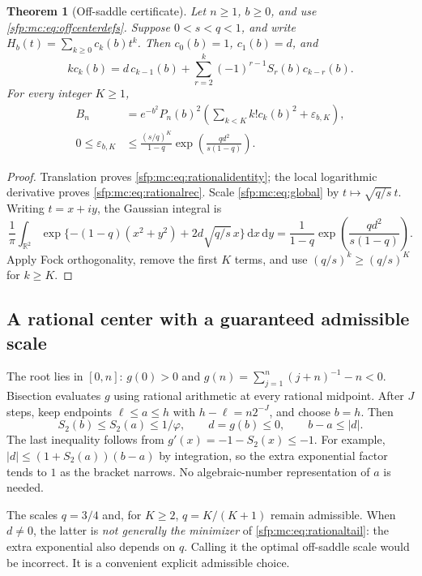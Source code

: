 \documentclass[11pt,letterpaper]{article}
\numberwithin{equation}{section}
\newtheorem{theorem}{Theorem}[section]
\theoremstyle{definition}\newtheorem{definition}[theorem]{Definition}
\theoremstyle{remark}\newtheorem{remark}[theorem]{Remark}
\newcommand{\dd}{\,\mathrm d}
\begin{document}
\begin{theorem}[Off-saddle certificate]\label{sfp:mc:thm:rational}
Let $n\geq1$, $b\geq0$, and use \eqref{sfp:mc:eq:offcenterdefs}.
Suppose $0<s<q<1$, and write $H_b(t)=\sum_{k\geq0}c_k(b)t^k$.
Then $c_0(b)=1$, $c_1(b)=d$, and
\begin{equation}\label{sfp:mc:eq:rationalrec}
 kc_k(b)=d\,c_{k-1}(b)+
 \sum_{r=2}^{k}(-1)^{r-1}S_r(b)c_{k-r}(b).
\end{equation}
For every integer $K\geq1$,
\begin{align}
 B_n&=e^{-b^2}P_n(b)^2
    \left(\sum_{k<K}k!c_k(b)^2+\varepsilon_{b,K}\right),
    \label{sfp:mc:eq:rationalidentity}\\
 0\leq\varepsilon_{b,K}
 &\leq\frac{(s/q)^K}{1-q}
     \exp\left(\frac{qd^2}{s(1-q)}\right).
    \label{sfp:mc:eq:rationaltail}
\end{align}
\end{theorem}
\begin{proof}
Translation proves \eqref{sfp:mc:eq:rationalidentity}; the local logarithmic
derivative proves \eqref{sfp:mc:eq:rationalrec}. Scale \eqref{sfp:mc:eq:global}
by $t\mapsto\sqrt{q/s}\,t$. Writing $t=x+iy$, the Gaussian
integral is
\[
 \frac1\pi\int_{\mathbb R^2}
 \exp\{-(1-q)(x^2+y^2)+2d\sqrt{q/s}\,x\}\dd x\dd y
 =\frac1{1-q}\exp\left(\frac{qd^2}{s(1-q)}\right).
\]
Apply Fock orthogonality, remove the first $K$ terms, and use
$(q/s)^k\geq(q/s)^K$ for $k\geq K$.
\end{proof}

\subsection{A rational center with a guaranteed admissible scale}
The root lies in $[0,n]$: $g(0)>0$ and
$g(n)=\sum_{j=1}^{n}(j+n)^{-1}-n<0$.
Bisection evaluates $g$ using rational arithmetic at every rational
midpoint. After $J$ steps, keep endpoints $\ell\leq a\leq h$
with $h-\ell=n2^{-J}$, and choose $b=h$. Then
\begin{equation}\label{sfp:mc:eq:uppercenter}
 S_2(b)\leq S_2(a)\leq1/\varphi,\qquad
 d=g(b)\leq0,\qquad b-a\leq|d|.
\end{equation}
The last inequality follows from $g'(x)=-1-S_2(x)\leq-1$.
For example, $|d|\leq(1+S_2(a))(b-a)$ by integration, so the
extra exponential factor tends to $1$ as the bracket narrows.
No algebraic-number representation of $a$ is needed.

The scales $q=3/4$ and, for $K\geq2$, $q=K/(K+1)$ remain
admissible. When $d\ne0$, the latter is \emph{not generally the
minimizer} of \eqref{sfp:mc:eq:rationaltail}: the extra exponential also
depends on $q$. Calling it the optimal off-saddle scale would be
incorrect. It is a convenient explicit admissible choice.
\end{document}
